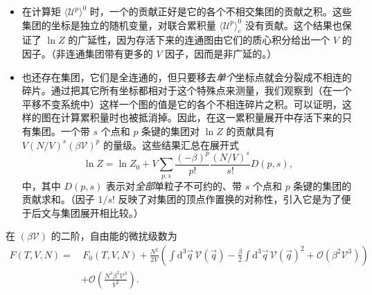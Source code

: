 \begin{itemize}
\item 在计算矩 $\langle\mathcal U^p\rangle^0$ 时，一个的贡献正好是它的各个不相交集团的贡献之积。这些集团的坐标是独立的随机变量，对联合累积量 $\langle\mathcal U^p\rangle_c^0$ 没有贡献。这个结果也保证了 $\ln Z$ 的广延性，因为存活下来的连通图由它们的质心积分给出一个 $V$ 的因子。（非连通集团带有更多的 $V$ 因子，因而是非广延的。）


\item 也还存在集团，它们是全连通的，但只要移去\emph{单个}坐标点就会分裂成不相连的碎片。通过把其它所有坐标都相对于这个特殊点来测量，我们观察到（在一个平移不变系统中）这样一个图的值是它的各个不相连碎片之积。可以证明，这样的图在计算累积量时也被抵消掉。因此，在这一累积量展开中存活下来的只有集团。一个带 $s$ 个点和 $p$ 条键的集团对 $\ln Z$ 的贡献具有 $V(N/V)^s(\beta\mathscr V)^p$ 的量级。这些结果汇总在展开式
\begin{equation}\label{eq:5.12}
\ln Z=\ln Z_0+V\sum_{p,s}\frac{(-\beta)^p}{p!}\frac{(N/V)^s}{s!}D(p,s),
\end{equation}
中，其中 $D(p,s)$ 表示对\emph{全部}单粒子不可约的、带 $s$ 个点和 $p$ 条键的集团的贡献求和。（因子 $1/s!$ 反映了对集团的顶点作置换的对称性，引入它是为了便于后文与集团展开相比较。）
\end{itemize}

在 $(\beta\mathscr V)$ 的二阶，自由能的微扰级数为
\begin{equation}\label{eq:5.13}
\begin{aligned}
F(T,V,N)=&\,F_0(T,V,N)+\frac{N^2}{2V}\left(\int\mathrm{d}^3\vec q\,\mathscr V(\vec q)-\frac{\beta}{2}\int\mathrm{d}^3\vec q\,\mathscr V(\vec q)^2+\mathcal O(\beta^2\mathscr V^3)\right)\\
&+\mathcal O\left(\frac{N^3\beta^2\mathscr V^3}{V^2}\right).
\end{aligned}
\end{equation}

